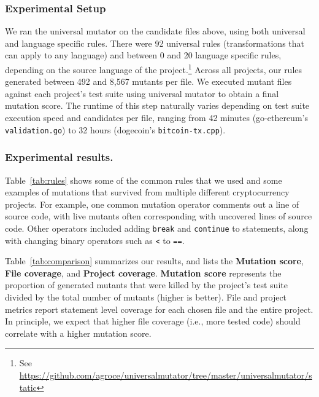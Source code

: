 \subsubsection*{Experimental Setup}
We ran the universal mutator on the candidate files above, using both universal and
language specific rules. There were 92 universal rules (transformations that can apply to
any language) and between 0 and 20 language specific rules, depending on the source language
of the project.\footnote{See \url{https://github.com/agroce/universalmutator/tree/master/universalmutator/static}}
Across all projects, our rules generated between 492 and 8,567 mutants per file.
We executed mutant files against each project's test suite using universal mutator to obtain a final mutation score. The runtime
of this step naturally varies depending on test suite execution speed and candidates per file, ranging from
42 minutes (go-ethereum's {\tt validation.go}) to 32 hours (dogecoin's
{\tt bitcoin-tx.cpp}).

\subsubsection*{Experimental results.}

Table~\ref{tab:rules} shows some of the common rules that we used and some examples of mutations that survived
from multiple different cryptocurrency projects. For example, one common mutation operator comments out a line
of source code, with live mutants often corresponding with uncovered lines of source code. Other operators
included adding {\tt break} and {\tt continue} to statements, along with changing binary operators such as \texttt{<} to \texttt{==}.

Table~\ref{tab:comparison} summarizes our results, and lists the
\textbf{Mutation score}, \textbf{File coverage}, and \textbf{Project coverage}. \textbf{Mutation score} represents the proportion of
generated mutants that were killed by the project's test suite divided by the total number
of mutants (higher is better). File and project metrics report statement level coverage
for each chosen file and the entire project. In principle, we expect that higher file coverage
(i.e., more tested code) should correlate with a higher mutation
score.

